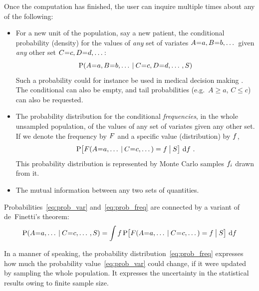 Once the computation has finished, the user can inquire multiple times about any of the following:
\setlength{\leftmargini}{17.62pt}
\begin{itemize}
  \itemsep0.5ex
\item For a new unit of the population, say a new patient, the conditional probability (density) for the values of \emph{any} set of variates $A \mo a, B \mo b, \dotso$ given \emph{any} other set $C \mo c, D \mo d, \dotso$:
  \begin{equation}\label{eq:prob_var}
    \P(A \mo a, B \mo b, \dotso \|C \mo c, D \mo d, \dotso , S)
  \end{equation}
  Such a probability could for instance be used in medical decision making \citep{soxetal1988_r2024,huninketal2001_r2014}. The conditional can also be empty, and tail probabilities (e.g.\ $A \ge a$, $C \le c$) can also be requested.

\item The probability distribution for the conditional \emph{frequencies}, in the whole unsampled population, of the values of any set of variates given any other set. If we denote the frequency by $F$ and a specific value (distribution) by $f$,
  \begin{equation}\label{eq:prob_freq}
    \P\bigl[ \yF(A \mo a, \dotso \|C \mo c, \dotso) = \yf \|[\big] S\bigr]
    \,\di\yf \ .
  \end{equation}
This probability distribution is represented by Monte Carlo samples $f_{i}$ drawn from it.

\item The mutual information \citep[Ch.~8]{mackay1995_r2005} between any two sets of quantities.
\end{itemize}
\vspace{-\topsep}

Probabilities~\eqref{eq:prob_var} and~\eqref{eq:prob_freq} are connected by a variant of de~Finetti's theorem:
\begin{equation}
  \label{eq:definetti1}
  \P(A \mo a, \dotso \|C \mo c, \dotso , S)  =
  \int \yf \,
  \P\bigl[ \yF(A \mo a, \dotso \|C \mo c, \dotso) = \yf \|[\big] S\bigr]
  \,\di\yf
\end{equation}

In a manner of speaking, the probability distribution~\eqref{eq:prob_freq} expresses how much the probability value~\eqref{eq:prob_var} could change, if it were updated by sampling the whole population. It expresses the uncertainty in the statistical results owing to finite sample size.

